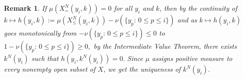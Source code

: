 \documentclass[12pt,reqno]{amsart}
\newtheorem{prop}{Proposition}
\newtheorem{remark}{Remark}
\begin{document}
\begin{remark}
    If $\mu(X^N_{=}(y_i, k))=0$ for all $y_i$ and $k$, then by the continuity of $k\mapsto h(y_i,k):=\mu(X_{\le}^N(y_i,k))-\nu(\{y_{p}:\, 0\le p\le i \})$ and as $k\mapsto h(y_i,k)$ goes monotonically from $-\nu(\{y_{p}:\, 0\le p\le i \}) \leq 0$ to $1-\nu(\{y_{p}:\, 0\le p\le i \})\geq 0,$ by the Intermediate Value Theorem, there exists $k^N(y_i)$ such that $h(y_i,k^N(y_i))=0.$ Since $\mu$ assigns positive measure to every nonempty open subset of $X$, we get the uniqueness of $k^N(y_i).$ %

\end{remark}



    

\end{document}
